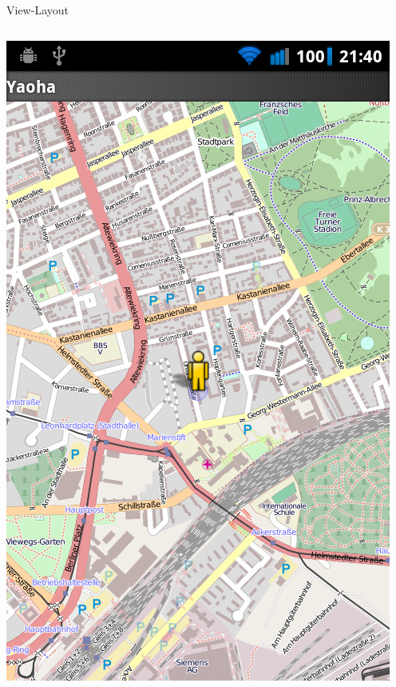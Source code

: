 \documentclass[hyperref]{beamer}
\begin{document}
\begin{frame}{View-Layout}
\begin{columns}
    	\includegraphics[scale=0.17]{map_plain.png}
    \end{columns}
\end{frame}
\end{document}
